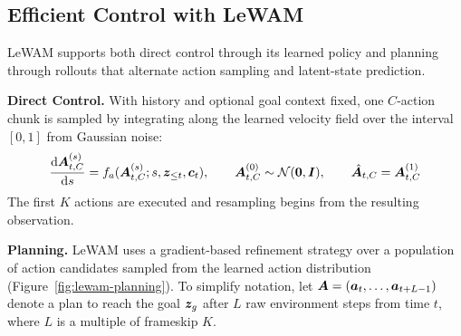 \documentclass{article} %
\newcommand{\methodname}[1]{\textup{#1}}
\newcommand{\method}{\methodname{LeWAM}}
\newcommand{\lead}[1]{\textbf{#1}}
\begin{document}
\subsection{Efficient Control with LeWAM}
\label{sec:control-planning}

\method{} supports both direct control through its learned policy and planning through rollouts that alternate action sampling and latent-state prediction.

\lead{Direct Control.} With history and optional goal context fixed, one $C$-action chunk is sampled by integrating along the learned velocity field over the interval $[0,1]$ from Gaussian noise:
\begin{equation}
    \frac{\mathrm d{\bm{A}}_{t,C}^{(s)}}{\mathrm ds}
    =f_a({\bm{A}}_{t,C}^{(s)};s,{\bm{z}}_{\leq t},{\bm{c}}_t),
    \qquad {\bm{A}}_{t,C}^{(0)}\sim\mathcal{N}({\bm{0}},{\bm{I}}),
    \qquad \hat{{\bm{A}}}_{t,C}={\bm{A}}_{t,C}^{(1)}
    \label{eq:action-initialization}
\end{equation}
The first $K$ actions are executed and resampling begins from the resulting observation.

\lead{Planning.} \method{} uses a gradient-based refinement strategy over a population of action candidates sampled from the learned action distribution (Figure~\ref{fig:lewam-planning}).
To simplify notation, let ${\bm{A}}=({\bm{a}}_t,\dots,{\bm{a}}_{t+L-1})$ denote a plan to reach the goal ${\bm{z}}_g$ after $L$ raw environment steps from time $t$, where $L$ is a multiple of frameskip $K$.
\end{document}
